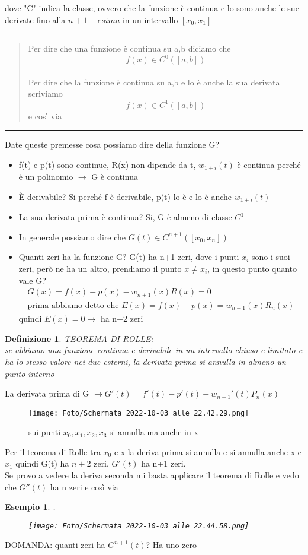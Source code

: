 \documentclass[a4paper, portrait]{book}
\numberwithin{equation}{chapter} %
\newtheorem{definition}{Definizione}
\newtheorem{example}{Esempio}
\newcommand*\sepline{%
  \begin{center}
    \rule[1ex]{.5\textwidth}{.5pt}
  \end{center}}
\begin{document}
\begin{center}
    dove "C" indica la classe, ovvero che la funzione è continua e lo sono anche le sue derivate fino alla $n+1-esima$ in un intervallo $[x_0,x_1]$
\end{center}
\sepline{}
\begin{quote}
    Per dire che una funzione è continua su a,b diciamo che $$f(x) \in C^0([a,b])$$\\
    Per dire che la funzione è continua su a,b e lo è anche la sua derivata scriviamo $$f(x) \in C^1([a,b])$$
    e così via
\end{quote}
\sepline{}
Date queste premesse cosa possiamo dire della funzione G?
\begin{itemize}
    \item f(t) e p(t) sono continue, R(x) non dipende da t, $w_{1+i}(t)$ è continua perché è un polinomio $\rightarrow$ G è continua
    \item È derivabile? Si perché f è derivabile, p(t) lo è e lo è anche $w_{1+i}(t)$
    \item La sua derivata prima è continua? Si, G è almeno di classe $C^1$
    \item In generale possiamo dire che $G(t) \in C^{n+1} ([x_0,x_n])$
    \item Quanti zeri ha la funzione G? G(t) ha n+1 zeri, dove i punti $x_i$ sono i suoi zeri, però ne ha un altro, prendiamo il punto $x \neq x_i$, in questo punto quanto vale G?
    \begin{gather}
        G(x) = f(x) - p(x) - w_{n+1}(x)R(x) = 0\\
        \text{prima abbiamo detto che } E(x) = f(x) - p(x) = w_{n+1}(x)R_n(x)
    \end{gather}
    quindi $E(x) = 0 \longrightarrow$ ha n+2 zeri
\end{itemize}
\begin{definition}
    TEOREMA DI ROLLE:\\
    se abbiamo una funzione continua e derivabile in un intervallo chiuso e limitato e ha lo stesso valore nei due esterni, la derivata prima si annulla in almeno un punto interno
\end{definition}
La derivata prima di G $\rightarrow G'(t) = f'(t) - p'(t) -w_{n+1}' (t) P_n(x)$
\begin{figure}[h!]
    \centering
    \texttt{[image: Foto/Schermata 2022-10-03 alle 22.42.29.png]}
    \caption{sui punti $x_0,x_1,x_2,x_3$ si annulla ma anche in x}
\end{figure}
Per il teorema di Rolle tra $x_0$ e x la deriva prima si annulla e si annulla anche x e $x_1$ quindi G(t) ha $n+2$ zeri, $G'(t)$ ha n+1 zeri.\\
Se provo a vedere la deriva seconda mi basta applicare il teorema di Rolle e vedo che $G''(t)$ ha n zeri e così via
\newpage
\begin{example}.
    \begin{figure}[h!]
        \centering
        \texttt{[image: Foto/Schermata 2022-10-03 alle 22.44.58.png]}
        \caption{}
    \end{figure}
\end{example}
DOMANDA: quanti zeri ha $G^{n+1}(t)$? Ha uno zero\\
\end{document}

